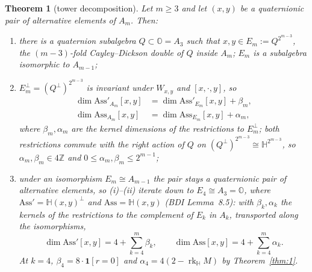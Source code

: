\documentclass{baustms}
\theoremstyle{cupthm}
\newtheorem{thm}{Theorem}[section]
\numberwithin{equation}{section}
\newcommand{\Ass}{\mathrm{Ass}}
\newcommand{\HH}{\mathbb{H}}
\newcommand{\OO}{\mathbb{O}}
\newcommand{\rk}{\operatorname{rk}}
\newcommand{\one}[1]{\mathbf{1}[#1]}
\begin{document}
\begin{thm}[tower decomposition]\label{thm:2}
Let $m\ge 3$ and let $(x,y)$ be a quaternionic pair of alternative elements of $A_m$. Then:
\begin{enumerate}
\item[\rm(i)] there is a quaternion subalgebra $Q\subset\OO=A_3$ such that $x,y\in E_m:=Q^{2^{m-3}}$, the $(m-3)$-fold Cayley--Dickson double of $Q$ inside $A_m$; $E_m$ is a subalgebra isomorphic to $A_{m-1}$;
\item[\rm(ii)] $E_m^\perp=(Q^\perp)^{2^{m-3}}$ is invariant under $W_{x,y}$ and $[x,\cdot,y]$, so
\begin{align*}
\dim\Ass'_{A_m}[x,y]&=\dim\Ass'_{E_m}[x,y]+\beta_m,\\
\dim\Ass_{A_m}[x,y]&=\dim\Ass_{E_m}[x,y]+\alpha_m,
\end{align*}
where $\beta_m,\alpha_m$ are the kernel dimensions of the restrictions to $E_m^\perp$; both restrictions commute with the right action of $Q$ on $(Q^\perp)^{2^{m-3}}\cong\HH^{2^{m-3}}$, so $\alpha_m,\beta_m\in 4\mathbb{Z}$ and $0\le\alpha_m,\beta_m\le 2^{m-1}$;
\item[\rm(iii)] under an isomorphism $E_m\cong A_{m-1}$ the pair stays a quaternionic pair of alternative elements, so {\rm(i)--(ii)} iterate down to $E_4\cong A_3=\OO$, where $\Ass'=\HH(x,y)^\perp$ and $\Ass=\HH(x,y)$ (BDI Lemma~8.5): with $\beta_k,\alpha_k$ the kernels of the restrictions to the complement of $E_k$ in $A_k$, transported along the isomorphisms,
\[
\dim\Ass'[x,y]=4+\sum_{k=4}^{m}\beta_k,\qquad
\dim\Ass[x,y]=4+\sum_{k=4}^{m}\alpha_k.
\]
At $k=4$, $\beta_4=8\cdot\one{r=0}$ and $\alpha_4=4(2-\rk_{\HH} M)$ by Theorem~\ref{thm:1}.
\end{enumerate}
\end{thm}
\end{document}
